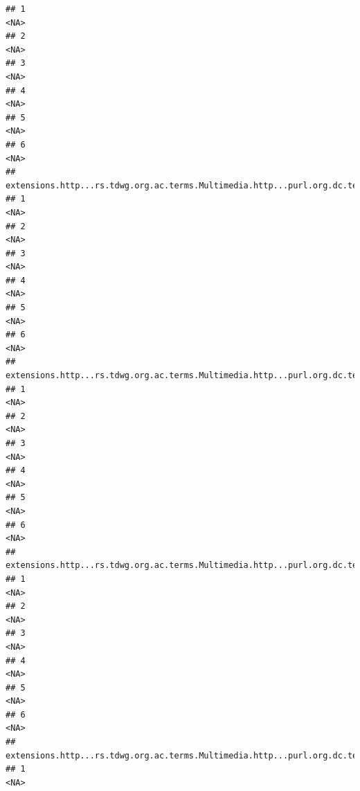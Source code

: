\documentclass[
]{book}
\begin{document}
\begin{verbatim}
## 1                                                                                       <NA>
## 2                                                                                       <NA>
## 3                                                                                       <NA>
## 4                                                                                       <NA>
## 5                                                                                       <NA>
## 6                                                                                       <NA>
##   extensions.http...rs.tdwg.org.ac.terms.Multimedia.http...purl.org.dc.terms.rights.1
## 1                                                                                <NA>
## 2                                                                                <NA>
## 3                                                                                <NA>
## 4                                                                                <NA>
## 5                                                                                <NA>
## 6                                                                                <NA>
##   extensions.http...rs.tdwg.org.ac.terms.Multimedia.http...purl.org.dc.terms.source.1
## 1                                                                                <NA>
## 2                                                                                <NA>
## 3                                                                                <NA>
## 4                                                                                <NA>
## 5                                                                                <NA>
## 6                                                                                <NA>
##   extensions.http...rs.tdwg.org.ac.terms.Multimedia.http...purl.org.dc.terms.type.1
## 1                                                                              <NA>
## 2                                                                              <NA>
## 3                                                                              <NA>
## 4                                                                              <NA>
## 5                                                                              <NA>
## 6                                                                              <NA>
##   extensions.http...rs.tdwg.org.ac.terms.Multimedia.http...purl.org.dc.terms.format.1
## 1                                                                                <NA>

\end{verbatim}
\end{document}
